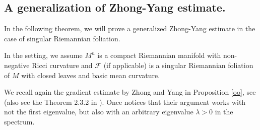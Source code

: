 \documentclass[11pt]{amsart}
\begin{document}



\subsection{A generalization of Zhong-Yang estimate.}\label{888}


In the following theorem, we will prove a generalized Zhong-Yang estimate in the case of singular Riemannian foliation. 

In the setting, we assume $M^n$ is a compact Riemannian manifold  with non-negative Ricci curvature and $\mathcal{F}$ (if applicable) is a singular Riemannian foliation of $M$ with closed leaves and basic mean curvature.


We recall again the gradient estimate by Zhong and Yang in Proposition \ref{oo}, see \cite{zhongyang} (also see the Theorem 2.3.2 in \cite{xianguo}). Once notices that their argument works with not the first eigenvalue, but also with an arbitrary eigenvalue $\lambda>0$ in the spectrum.
\end{document}
